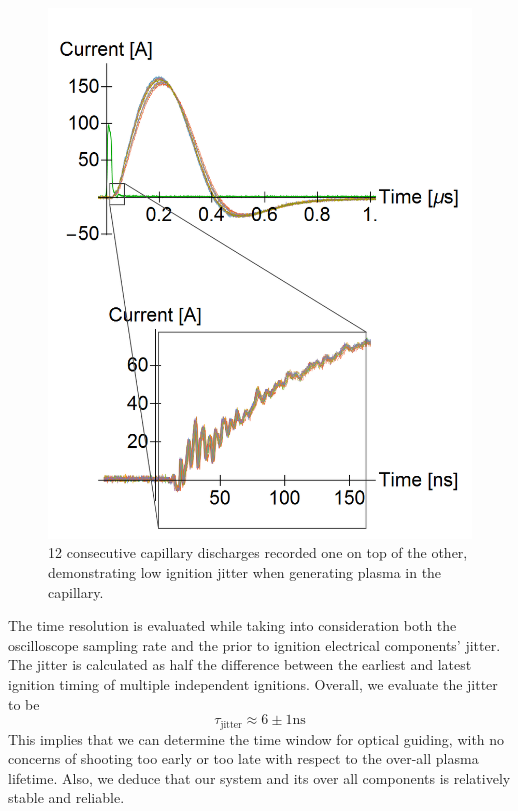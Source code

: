 \documentclass[../main.tex]{subfiles}
\begin{document}
\begin{figure}
    \centering
    \includegraphics[width=\textwidth]{figures/jitter/low_jitter.png}
    \caption{12 consecutive capillary discharges recorded one on top of the other, demonstrating low ignition jitter when generating plasma in the capillary.}
    \label{fig:low_jitter}
\end{figure}

The time resolution is evaluated while taking into consideration both the oscilloscope sampling rate and the prior to ignition electrical components' jitter. The jitter is calculated as half the difference between the earliest and latest ignition timing of multiple independent ignitions. Overall, we evaluate the jitter to be
\begin{equation}
	\tau_\text{jitter}\approx 6\pm 1\si{\ns}
\end{equation}
This implies that we can determine the time window for optical guiding, with no concerns of shooting too early or too late with respect to the over-all plasma lifetime. Also, we deduce that our system and its over all components is relatively stable and reliable.
\end{document}
